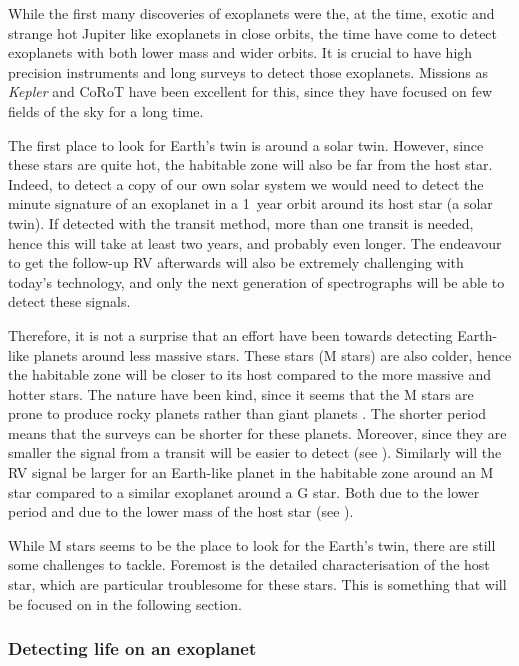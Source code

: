 While the first many discoveries of exoplanets were the, at the time, exotic and strange hot Jupiter
like exoplanets in close orbits, the time have come to detect exoplanets with both lower mass and
wider orbits. It is crucial to have high precision instruments and long surveys to detect those
exoplanets. Missions as \emph{Kepler} and CoRoT have been excellent for this, since they have
focused on few fields of the sky for a long time.

The first place to look for Earth's twin is around a solar twin. However, since these stars are
quite hot, the habitable zone will also be far from the host star. Indeed, to detect a copy of our
own solar system we would need to detect the minute signature of an exoplanet in a \SI{1}{year}
orbit around its host star (a solar twin). If detected with the transit method, more than one
transit is needed, hence this will take at least two years, and probably even longer. The endeavour
to get the follow-up RV afterwards will also be extremely challenging with today's technology, and
only the next generation of spectrographs will be able to detect these signals.

Therefore, it is not a surprise that an effort have been towards detecting Earth-like planets around
less massive stars. These stars (M stars) are also colder, hence the habitable zone will be closer
to its host compared to the more massive and hotter stars. The nature have been kind, since it seems
that the M stars are prone to produce rocky planets rather than giant planets
\citep{Bonfils2013,Delfosse2013}. The shorter period means that the surveys can be shorter for these
planets. Moreover, since they are smaller the signal from a transit will be easier to detect (see
). Similarly will the RV signal be larger for an Earth-like planet in the habitable
zone around an M star compared to a similar exoplanet around a G star. Both due to the lower period
and due to the lower mass of the host star (see ).

While M stars seems to be the place to look for the Earth's twin, there are still some challenges to
tackle. Foremost is the detailed characterisation of the host star, which are particular troublesome
for these stars. This is something that will be focused on in the following section.

\subsubsection{Detecting life on an exoplanet}

